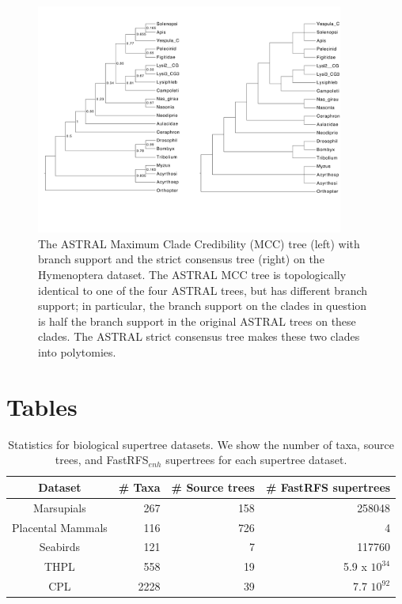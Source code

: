 \begin{figure}[ht]
\centering
\includegraphics[width=0.9\textwidth]{siesta-figs/hymenoptera-figure8.pdf}
\caption[ASTRAL Maximum Clade Credibility Tree and strict consensus tree on biological Hymenoptera dataset]{The ASTRAL  Maximum Clade Credibility (MCC) tree (left) with branch support and the strict consensus tree (right) on the Hymenoptera dataset. 
The ASTRAL MCC tree is topologically identical to one of the four ASTRAL trees, but has different branch support; in particular, the branch support on the clades in question is half the branch support in the original ASTRAL trees on these clades. 
The ASTRAL strict consensus tree makes these two clades into polytomies. 
}\label{siesta::fig:hymenoptera-fig8}
\end{figure}


\clearpage
\section{Tables}
\clearpage

  \begin{table}
  \caption[Statistics for biological supertree datasets for SIESTA study]{Statistics for biological supertree datasets. We show the number of taxa, source trees, and FastRFS$_{enh}$ supertrees for each supertree dataset. } \label{siesta::table:bio-supertree}
   \begin{tabular}{|c|r|r|r|}
     \hline
     Dataset & \# Taxa & \# Source trees  &  \# FastRFS supertrees \\
     \hline
     Marsupials \cite{marsupial} & 267 & 158 & 258048 \\
     Placental Mammals \cite{placental} & 116 & 726  &  4\\
     Seabirds \cite{kennedy2002seabird} & 121 & 7 & 117760\\
     THPL \cite{THPL}& 558 & 19  &  5.9 x  $10^{34}$\\
     CPL \cite{cpl}& 2228 & 39   & 7.7 $10^{92}$  \\
     \hline
   \end{tabular}
  \end{table}


